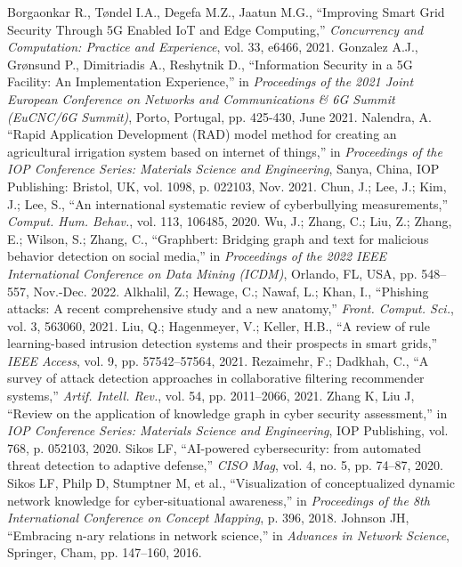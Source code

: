\documentclass[conference]{IEEEtran}
\begin{document}
\begin{thebibliography}{00}
     Borgaonkar R., Tøndel I.A., Degefa M.Z., Jaatun M.G., ``Improving Smart Grid Security Through 5G Enabled IoT and Edge Computing,'' \textit{Concurrency and Computation: Practice and Experience}, vol. 33, e6466, 2021.
     Gonzalez A.J., Grønsund P., Dimitriadis A., Reshytnik D., ``Information Security in a 5G Facility: An Implementation Experience,'' in \textit{Proceedings of the 2021 Joint European Conference on Networks and Communications \& 6G Summit (EuCNC/6G Summit)}, Porto, Portugal, pp. 425-430, June 2021.
     Nalendra, A. ``Rapid Application Development (RAD) model method for creating an agricultural irrigation system based on internet of things,'' in \textit{Proceedings of the IOP Conference Series: Materials Science and Engineering}, Sanya, China, IOP Publishing: Bristol, UK, vol. 1098, p. 022103, Nov. 2021.
     Chun, J.; Lee, J.; Kim, J.; Lee, S., ``An international systematic review of cyberbullying measurements,'' \textit{Comput. Hum. Behav.}, vol. 113, 106485, 2020.
     Wu, J.; Zhang, C.; Liu, Z.; Zhang, E.; Wilson, S.; Zhang, C., ``Graphbert: Bridging graph and text for malicious behavior detection on social media,'' in \textit{Proceedings of the 2022 IEEE International Conference on Data Mining (ICDM)}, Orlando, FL, USA, pp. 548–557, Nov.-Dec. 2022.
     Alkhalil, Z.; Hewage, C.; Nawaf, L.; Khan, I., ``Phishing attacks: A recent comprehensive study and a new anatomy,'' \textit{Front. Comput. Sci.}, vol. 3, 563060, 2021.
     Liu, Q.; Hagenmeyer, V.; Keller, H.B., ``A review of rule learning-based intrusion detection systems and their prospects in smart grids,'' \textit{IEEE Access}, vol. 9, pp. 57542–57564, 2021.
     Rezaimehr, F.; Dadkhah, C., ``A survey of attack detection approaches in collaborative filtering recommender systems,'' \textit{Artif. Intell. Rev.}, vol. 54, pp. 2011–2066, 2021.
     Zhang K, Liu J, ``Review on the application of knowledge graph in cyber security assessment,'' in \textit{IOP Conference Series: Materials Science and Engineering}, IOP Publishing, vol. 768, p. 052103, 2020.
     Sikos LF, ``AI-powered cybersecurity: from automated threat detection to adaptive defense,'' \textit{CISO Mag}, vol. 4, no. 5, pp. 74–87, 2020.
     Sikos LF, Philp D, Stumptner M, et al., ``Visualization of conceptualized dynamic network knowledge for cyber-situational awareness,'' in \textit{Proceedings of the 8th International Conference on Concept Mapping}, p. 396, 2018.
     Johnson JH, ``Embracing n-ary relations in network science,'' in \textit{Advances in Network Science}, Springer, Cham, pp. 147–160, 2016.

\end{thebibliography}
\end{document}
